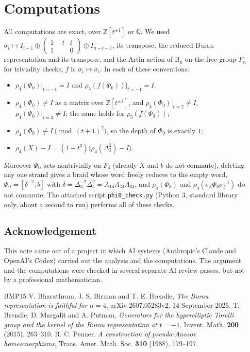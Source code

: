 \documentclass[11pt]{amsart}
\theoremstyle{remark}
\newcommand{\B}{\mathrm{B}}
\newcommand{\at}{\big|_{t=-1}}
\begin{document}
\appendix
\section{Computations}

All computations are exact, over $\mathbb{Z}[t^{\pm1}]$ or $\mathbb{Q}$. We used $\sigma_i\mapsto I_{i-1}\oplus\begin{pmatrix}1-t&t\\1&0\end{pmatrix}\oplus I_{n-i-1}$, its transpose, the reduced Burau representation and its transpose, and the Artin action of $\B_n$ on the free group $F_n$ for triviality checks; $f$ is $\sigma_i\mapsto\sigma_i$. In each of these conventions:
\begin{itemize}
\item $\rho_4(\Phi_0)\at=I$ and $\rho_5(f(\Phi_0))\at=I$;
\item $\rho_4(\Phi_0)\neq I$ as a matrix over $\mathbb{Z}[t^{\pm1}]$, and $\rho_4(\Phi_0)|_{t=2}\neq I$, $\rho_4(\Phi_0)|_{t=3}\neq I$; the same holds for $\rho_5(f(\Phi_0))$;
\item $\rho_4(\Phi_0)\not\equiv I\pmod{(t+1)^2}$, so the depth of $\Phi_0$ is exactly $1$;
\item $\rho_4(X)-I=(1+t^3)\bigl(\rho_4(\Delta_3^2)-I\bigr)$.
\end{itemize}
Moreover $\Phi_0$ acts nontrivially on $F_4$ (already $X$ and $b$ do not commute), deleting any one strand gives a braid whose word freely reduces to the empty word, $\Phi_0=[\delta^{-2},b]$ with $\delta=\Delta_3^{-2}\Delta_4^2=A_{14}A_{24}A_{34}$, and $\rho_4(\Phi_0)$ and $\rho_4(\sigma_3\Phi_0\sigma_3^{-1})$ do not commute. The attached script \texttt{phi0\_check.py} (Python 3, standard library only, about a second to run) performs all of these checks.

\subsection*{Acknowledgement}
This note came out of a project in which AI systems (Anthropic's Claude and OpenAI's Codex) carried out the analysis and the computations. The argument and the computations were checked in several separate AI review passes, but not by a professional mathematician.

\begin{thebibliography}{BMP15}
 V. Bharathram, J. S. Birman and T. E. Brendle, \emph{The Burau representation is faithful for $n=4$}, arXiv:2607.05283v2, 14 September 2026.
 T. Brendle, D. Margalit and A. Putman, \emph{Generators for the hyperelliptic Torelli group and the kernel of the Burau representation at $t=-1$}, Invent. Math. \textbf{200} (2015), 263--310.
 R. C. Penner, \emph{A construction of pseudo-Anosov homeomorphisms}, Trans. Amer. Math. Soc. \textbf{310} (1988), 179--197.
\end{thebibliography}
\end{document}
